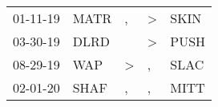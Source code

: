 \begin{supertabular}{p{0.07\textwidth}p{0.06\textwidth}p{0.02\textwidth}p{0.02\textwidth}p{0.06\textwidth}}
          01-11-19\textsuperscript{} &           MATR\textsuperscript{} &                , &     \textgreater &           SKIN\textsuperscript{} \\
          03-30-19\textsuperscript{} &           DLRD\textsuperscript{} &                  &     \textgreater &           PUSH\textsuperscript{} \\
          08-29-19\textsuperscript{} &            WAP\textsuperscript{} &     \textgreater &                , &           SLAC\textsuperscript{} \\
          02-01-20\textsuperscript{} &           SHAF\textsuperscript{} &                , &                , &           MITT\textsuperscript{} \\
\end{supertabular}
